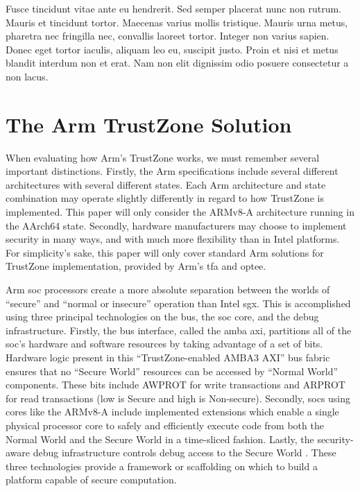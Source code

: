 Fusce tincidunt vitae ante eu hendrerit. Sed semper placerat nunc non rutrum. Mauris et tincidunt tortor. Maecenas varius mollis tristique. Mauris urna metus, pharetra nec fringilla nec, convallis laoreet tortor. Integer non varius sapien. Donec eget tortor iaculis, aliquam leo eu, suscipit justo. Proin et nisi et metus blandit interdum non et erat. Nam non elit dignissim odio posuere consectetur a non lacus.

\section{The Arm TrustZone Solution}
When evaluating how Arm’s TrustZone works, we must remember several important distinctions. Firstly, the Arm specifications include several different architectures with several different states. Each Arm architecture and state combination may operate slightly differently in regard to how TrustZone is implemented. This paper will only consider the ARMv8-A architecture running in the AArch64 state. Secondly, hardware manufacturers may choose to implement security in many ways, and with much more flexibility than in Intel platforms. For simplicity’s sake, this paper will only cover standard Arm solutions for TrustZone implementation, provided by Arm's \gls{tfa} and \gls{optee}.
 
Arm \gls{soc} processors create a more absolute separation between the worlds of ``secure'' and ``normal or insecure'' operation than Intel \gls{sgx}. This is accomplished using three principal technologies on the bus, the \gls{soc} core, and the debug infrastructure. Firstly, the bus interface, called the \gls{amba} \gls{axi}, partitions all of the \gls{soc}’s hardware and software resources by taking advantage of a set of bits. Hardware logic present in this ``TrustZone-enabled AMBA3 AXI'' bus fabric ensures that no ``Secure World'' resources can be accessed by ``Normal World'' components. These bits include AWPROT for write transactions and ARPROT for read transactions (low is Secure and high is Non-secure). Secondly, \gls{soc}s using cores like the ARMv8-A include implemented extensions which enable a single physical processor core to safely and efficiently execute code from both the Normal World and the Secure World in a time-sliced fashion. Lastly, the security-aware debug infrastructure controls debug access to the Secure World \cite{ArmWhitepaper}. These three technologies provide a framework or scaffolding on which to build a platform capable of secure computation.
